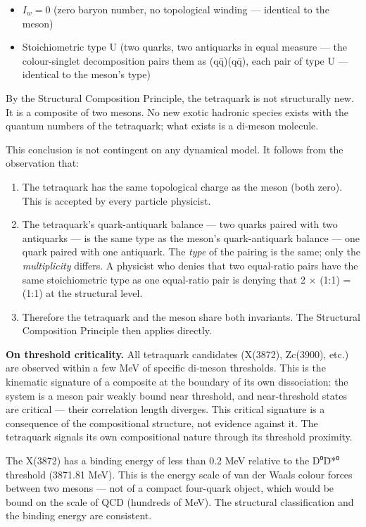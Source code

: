 \begin{itemize}
\tightlist
\item
  \(I_w = 0\) (zero baryon number, no topological winding --- identical
  to the meson)
\item
  Stoichiometric type U (two quarks, two antiquarks in equal measure ---
  the colour-singlet decomposition pairs them as (qq̄)(qq̄), each pair of
  type U --- identical to the meson's type)
\end{itemize}

By the Structural Composition Principle, the tetraquark is not
structurally new. It is a composite of two mesons. No new exotic
hadronic species exists with the quantum numbers of the tetraquark; what
exists is a di-meson molecule.

This conclusion is not contingent on any dynamical model. It follows
from the observation that:

\begin{enumerate}
\def\labelenumi{\arabic{enumi}.}
\tightlist
\item
  The tetraquark has the same topological charge as the meson (both
  zero). This is accepted by every particle physicist.
\item
  The tetraquark's quark-antiquark balance --- two quarks paired with
  two antiquarks --- is the same type as the meson's
  quark-antiquark balance --- one quark paired with one antiquark. The
  \emph{type} of the pairing is the same; only the \emph{multiplicity}
  differs. A physicist who denies that two equal-ratio pairs have the
  same stoichiometric type as one equal-ratio pair is denying that 2 ×
  (1:1) = (1:1) at the structural level.
\item
  Therefore the tetraquark and the meson share both invariants. The Structural Composition Principle then applies
  directly.
\end{enumerate}

\textbf{On threshold criticality.} All tetraquark candidates (X(3872),
Zc(3900), etc.) are observed within a few MeV of specific di-meson
thresholds. This is the kinematic signature of a composite at the
boundary of its own dissociation: the system is a meson pair weakly
bound near threshold, and near-threshold states are critical --- their
correlation length diverges. This critical signature is a consequence of
the compositional structure, not evidence against it. The tetraquark
signals its own compositional nature through its threshold proximity.

The X(3872) has a binding energy of less than 0.2 MeV relative to the
D⁰D̄*⁰ threshold (3871.81 MeV). This is the energy scale of van der Waals
colour forces between two mesons --- not of a compact four-quark object,
which would be bound on the scale of QCD (hundreds of MeV). The
structural classification and the binding energy are consistent.


